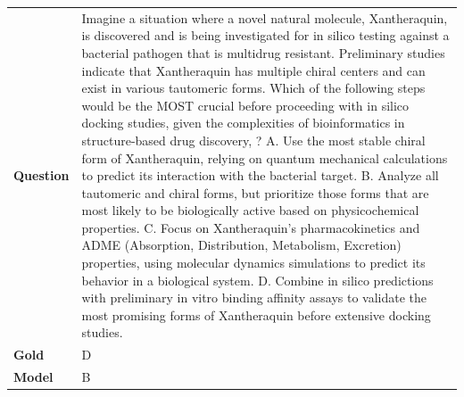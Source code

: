 \begin{longtable}{@{}l p{13cm}@{}}
  \textbf{Question}  & Imagine a situation where a novel natural molecule, Xantheraquin, is discovered and is being investigated for in silico testing against a bacterial pathogen that is multidrug resistant. Preliminary studies indicate that Xantheraquin has multiple chiral centers and can exist in various tautomeric forms. Which of the following steps would be the MOST crucial before proceeding with in silico docking studies, given the complexities of bioinformatics in structure-based drug discovery, ? \newline A. Use the most stable chiral form of Xantheraquin, relying on quantum mechanical calculations to predict its interaction with the bacterial target. \newline B. Analyze all tautomeric and chiral forms, but prioritize those forms that are most likely to be biologically active based on physicochemical properties. \newline C. Focus on Xantheraquin's pharmacokinetics and ADME (Absorption, Distribution, Metabolism, Excretion) properties, using molecular dynamics simulations to predict its behavior in a biological system. \newline D. Combine in silico predictions with preliminary in vitro binding affinity assays to validate the most promising forms of Xantheraquin before extensive docking studies.   \\
  \textbf{Gold}      & D       \\
  \textbf{Model}     & B  \\

\end{longtable}
